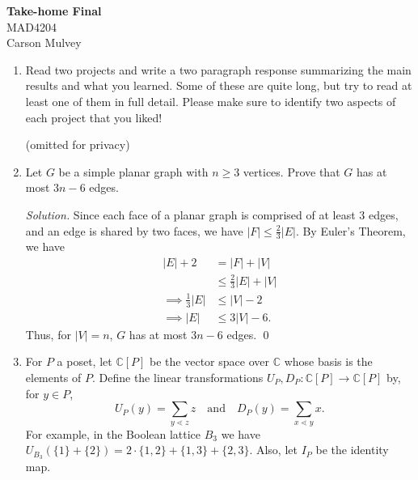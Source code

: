 \documentclass[11pt,letterpaper,dvipsnames]{article}
\newenvironment{solution}{\color{BlueViolet}\textit{Solution.}}{\color{black}}
\begin{document}

\flushleft

\begin{center}
    \begin{large}
        \textbf{Take-home Final} \\
        MAD4204 \\ 
        Carson Mulvey
    \end{large}
\end{center}

\pagestyle{empty}


\flushleft

\begin{enumerate}

	\item
	Read two projects and write a two paragraph response summarizing the main results and what you learned.
	Some of these are quite long, but try to read at least one of them in full detail.
	Please make sure to identify two aspects of each project that you liked!
	
	\color{BlueViolet}
	
	(omitted for privacy)
	
	\color{black}
	
	
	\item Let $G$ be a simple planar graph with $n \geq 3$ vertices.
	Prove that $G$ has at most $3n-6$ edges.
	
	\begin{solution}
		Since each face of a planar graph is comprised of at least 3 edges, and an edge is shared by two faces, we have $|F|\leq \frac{2}{3}|E|$. By Euler's Theorem, we have
		\begin{align*}
			|E|+2 &= |F|+|V| \\
			&\leq{} \frac{2}{3}|E|+|V| \\
			\implies \frac{1}{3}|E| &\leq |V|-2 \\
			\implies |E| &\leq 3|V|-6.
		\end{align*}
		Thus, for $|V|=n$, $G$ has at most $3n-6$ edges. \qed
	\end{solution}
	
	
	\item For $P$ a poset, let $\mathbb{C}[P]$ be the vector space over $\mathbb{C}$ whose basis is the elements of $P$.
	Define the linear transformations $U_P,D_P: \mathbb{C}[P] \to \mathbb{C}[P]$ by, for $y \in P$,
	\[
	U_P(y) = \sum_{y \lessdot z} z \quad \mbox{and} \quad D_P(y) = \sum_{x \lessdot y} x.
	\]
	For example, in the Boolean lattice $B_3$ we have $U_{B_3}(\{1\} + \{2\}) = 2 \cdot \{1,2\} + \{1,3\} + \{2,3\}$.
	Also, let $I_P$ be the identity map.
	

\end{enumerate}
\end{document}
